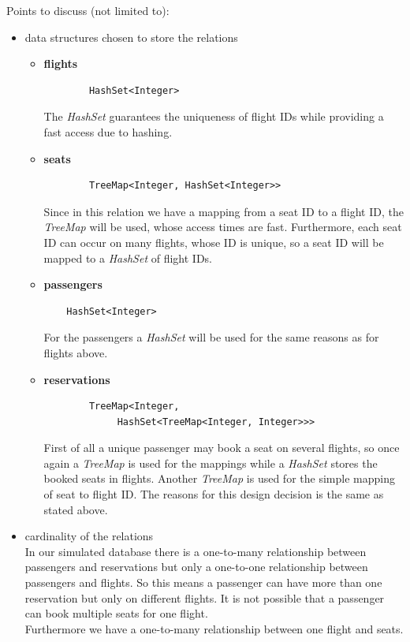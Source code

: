 \documentclass{vldb}
\begin{document}
Points to discuss (not limited to):
\begin{itemize}
\item data structures chosen to store the relations
\begin{itemize}
\item \textbf{flights}
	\begin{verbatim}
		HashSet<Integer>
	\end{verbatim} 
	The \textit{HashSet} guarantees the uniqueness of flight IDs while providing a fast access due to hashing.
\item \textbf{seats} 
	\begin{verbatim}
		TreeMap<Integer, HashSet<Integer>>
	\end{verbatim}
	Since in this relation we have a mapping from a seat ID to a flight ID, the \textit{TreeMap} will be used, whose access times are fast. Furthermore, each seat ID can occur on many flights, whose ID is unique, so a seat ID will be mapped to a \textit{HashSet} of flight IDs.
\item \textbf{passengers}
	\begin{verbatim}
	HashSet<Integer>
	\end{verbatim}
	For the passengers a \textit{HashSet} will be used for the same reasons as for flights above.
\item \textbf{reservations}
	\begin{verbatim}
		TreeMap<Integer, 
		     HashSet<TreeMap<Integer, Integer>>>
	\end{verbatim}
	First of all a unique passenger may book a seat on several flights, so once again a \textit{TreeMap} is used for the mappings while a \textit{HashSet} stores the booked seats in flights. Another \textit{TreeMap} is used for the simple mapping of seat to flight ID. The reasons for this design decision is the same as stated above.
\end{itemize}
\item cardinality of the relations
\\In our simulated database there is a one-to-many relationship between passengers and reservations but only a one-to-one relationship between passengers and flights. So this means a passenger can have more than one reservation but only on different flights. It is not possible that a passenger can book multiple seats for one flight.
\\Furthermore we have a one-to-many relationship between one flight and seats.
\end{itemize}
\end{document}

